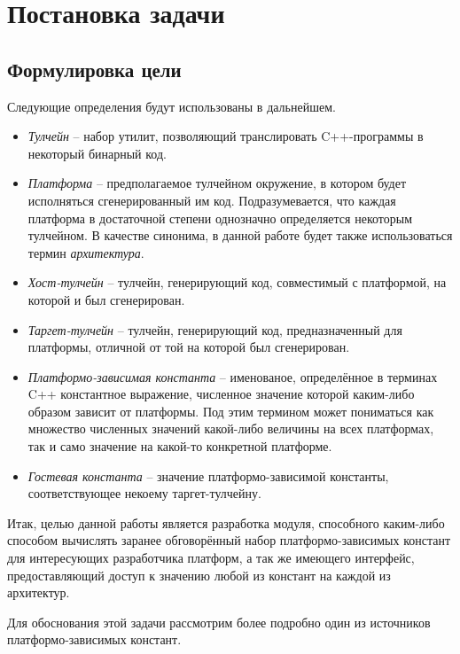 \chapter{Постановка задачи}
\label{sec:Chapter1} 

\section{Формулировка цели}

Следующие определения будут использованы в дальнейшем.

\begin{itemize}
    \item
        \textit{Тулчейн} -- набор утилит, позволяющий транслировать C++-программы в некоторый бинарный код.
    \item
        \textit{Платформа} -- предполагаемое тулчейном окружение, в котором будет исполняться сгенерированный им код. Подразумевается, что каждая платформа в достаточной степени однозначно определяется некоторым тулчейном. В качестве синонима, в данной работе будет также использоваться термин \textit{архитектура}.
    \item
        \textit{Хост-тулчейн} -- тулчейн, генерирующий код, совместимый с платформой, на которой и был сгенерирован.
    \item
        \textit{Таргет-тулчейн} -- тулчейн, генерирующий код, предназначенный для платформы, отличной от той на которой был сгенерирован.
    \item
        \textit{Платформо-зависимая константа} -- именованое, определённое в терминах C++ константное выражение, численное значение которой каким-либо образом зависит от платформы. Под этим термином может пониматься как множество численных значений какой-либо величины на всех платформах, так и само значение на какой-то конкретной платформе.
    \item
        \textit{Гостевая константа} -- значение платформо-зависимой константы, соответствующее некоему таргет-тулчейну.

\end{itemize}

Итак, целью данной работы является разработка модуля, способного каким-либо способом вычислять заранее обговорённый набор платформо-зависимых констант для интересующих разработчика платформ, а так же имеющего интерфейс, предоставляющий доступ к значению любой из констант на каждой из архитектур.
\par
Для обоснования этой задачи рассмотрим более подробно один из источников платформо-зависимых констант.
